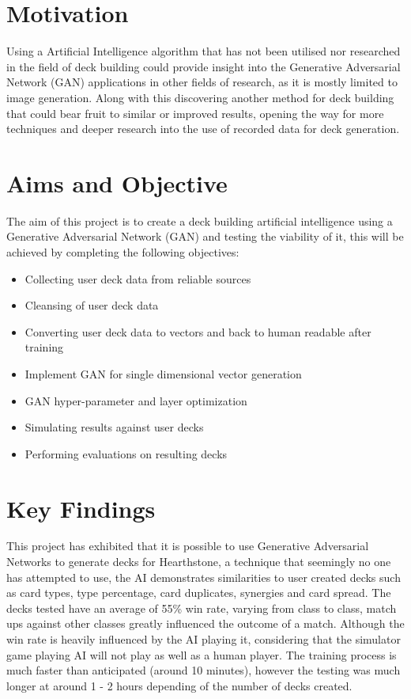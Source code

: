 \documentclass{report} %
\begin{document}
\section{Motivation}
Using a Artificial Intelligence algorithm that has not been utilised nor researched in the field of deck building could provide insight into the Generative Adversarial Network (GAN) applications in other fields of research, as it is mostly limited to image generation. Along with this discovering another method for deck building that could bear fruit to similar or improved results, opening the way for more techniques and deeper research into the use of recorded data for deck generation. 
\section{Aims and Objective}
The aim of this project is to create a deck building artificial intelligence using a Generative Adversarial Network (GAN) and testing the viability of it, this will be achieved by completing the following objectives:
\begin{itemize}
  \item Collecting user deck data from reliable sources
  \item Cleansing of user deck data
  \item Converting user deck data to vectors and back to human readable after training
  \item Implement GAN for single dimensional vector generation
  \item GAN hyper-parameter and layer optimization
  \item Simulating results against user decks
  \item Performing evaluations on resulting decks
\end{itemize}
\section{Key Findings}
This project has exhibited that it is possible to use Generative Adversarial Networks to generate decks for Hearthstone, a technique that seemingly no one has attempted to use, the AI demonstrates similarities to user created decks such as card types, type percentage, card duplicates, synergies and card spread. The decks tested have an average of 55\% win rate, varying from class to class, match ups against other classes greatly influenced the outcome of a match. Although the win rate is heavily influenced by the AI playing it, considering that the simulator game playing AI will not play as well as a human player. The training process is much faster than anticipated (around 10 minutes), however the testing was much longer at around 1 - 2 hours depending of the number of decks created.
\end{document}
